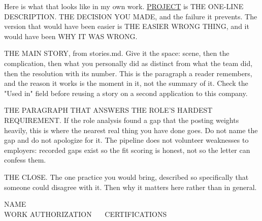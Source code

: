\documentclass[10pt,letterpaper]{article}
\newcommand{\eyebrow}[1]{{\ttfamily\scriptsize\color{faint}\addfontfeatures{LetterSpace=4.0}\MakeUppercase{#1}}}
\begin{document}
Here is what that looks like in my own work. \href{https://github.com/USER/PROJECT}{PROJECT}
is THE ONE-LINE DESCRIPTION. THE DECISION YOU MADE, and the failure it prevents.
The version that would have been easier is THE EASIER WRONG THING, and it would
have been WHY IT WAS WRONG.

THE MAIN STORY, from stories.md. Give it the space: scene, then the
complication, then what you personally did as distinct from what the team did,
then the resolution with its number. This is the paragraph a reader remembers,
and the reason it works is the moment in it, not the summary of it. Check the
"Used in" field before reusing a story on a second application to this company.

THE PARAGRAPH THAT ANSWERS THE ROLE'S HARDEST REQUIREMENT. If the role analysis
found a gap that the posting weights heavily, this is where the nearest real
thing you have done goes. Do not name the gap and do not apologize for it. The
pipeline does not volunteer weaknesses to employers: recorded gaps exist so the
fit scoring is honest, not so the letter can confess them.


THE CLOSE. The one practice you would bring, described so specifically that
someone could disagree with it. Then why it matters here rather than in general.

\vspace{2pt}
NAME\\[1pt]
\eyebrow{WORK AUTHORIZATION \ \textbullet\ \ CERTIFICATIONS}
\end{document}
